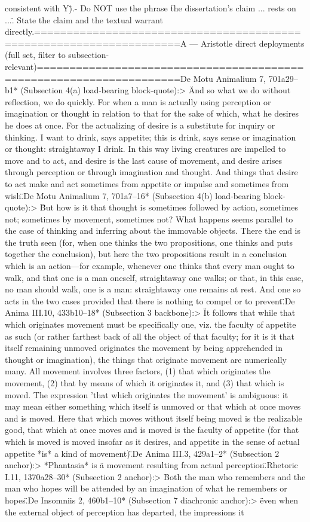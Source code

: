 {consistent with Y\").\n- Do NOT use the phrase \"the dissertation's claim ... rests on ...\". State the claim and the textual warrant directly.\n\n====================================================================\nSOURCE A — Aristotle direct deployments (full set, filter to subsection-relevant)\n====================================================================\n\n*De Motu Animalium 7, 701a29–b1* (Subsection 4(a) load-bearing block-quote):\n> \"And so what we do without reflection, we do quickly. For when a man is actually using perception or imagination or thought in relation to that for the sake of which, what he desires he does at once. For the actualizing of desire is a substitute for inquiry or thinking. I want to drink, says appetite; this is drink, says sense or imagination or thought: straightaway I drink. In this way living creatures are impelled to move and to act, and desire is the last cause of movement, and desire arises through perception or through imagination and thought. And things that desire to act make and act sometimes from appetite or impulse and sometimes from wish.\"\n\n*De Motu Animalium 7, 701a7–16* (Subsection 4(b) load-bearing block-quote):\n> \"But how is it that thought is sometimes followed by action, sometimes not; sometimes by movement, sometimes not? What happens seems parallel to the case of thinking and inferring about the immovable objects. There the end is the truth seen (for, when one thinks the two propositions, one thinks and puts together the conclusion), but here the two propositions result in a conclusion which is an action---for example, whenever one thinks that every man ought to walk, and that one is a man oneself, straightaway one walks; or that, in this case, no man should walk, one is a man: straightaway one remains at rest. And one so acts in the two cases provided that there is nothing to compel or to prevent.\"\n\n*De Anima III.10, 433b10–18* (Subsection 3 backbone):\n> \"It follows that while that which originates movement must be specifically one, viz. the faculty of appetite as such (or rather farthest back of all the object of that faculty; for it is it that itself remaining unmoved originates the movement by being apprehended in thought or imagination), the things that originate movement are numerically many. All movement involves three factors, (1) that which originates the movement, (2) that by means of which it originates it, and (3) that which is moved. The expression 'that which originates the movement' is ambiguous: it may mean either something which itself is unmoved or that which at once moves and is moved. Here that which moves without itself being moved is the realizable good, that which at once moves and is moved is the faculty of appetite (for that which is moved is moved insofar as it desires, and appetite in the sense of actual appetite *is* a kind of movement).\"\n\n*De Anima III.3, 429a1–2* (Subsection 2 anchor):\n> *Phantasia* is \"a movement resulting from actual perception.\"\n\n*Rhetoric I.11, 1370a28–30* (Subsection 2 anchor):\n> \"Both the man who remembers and the man who hopes will be attended by an imagination of what he remembers or hopes.\"\n\n*De Insomniis 2, 460b1–10* (Subsection 7 diachronic anchor):\n> \"even when the external object of perception has departed, the impressions it }
